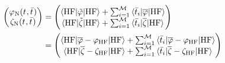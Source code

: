 \begin{equation}
  \begin{aligned}
  \begin{pmatrix}
    \varphi_{\mathrm{N}}(t_{}, \bar{t}_{}) \\
    \zeta_{\mathrm{N}}(t_{}, \bar{t}_{})
  \end{pmatrix}
  &=
  \begin{pmatrix}
   \braket{\mathrm{HF} | \tilde{\varphi} | \mathrm{HF}}
  + \sum_{i=1}^{\mathcal{M}}\braket{\bar{t}_{i} | \overline{\varphi} | \mathrm{HF}} \\
   \braket{\mathrm{HF} | \tilde{\zeta} | \mathrm{HF}}
  + \sum_{i=1}^{\mathcal{M}}\braket{\bar{t}_{i} | \overline{\zeta} | \mathrm{HF}}
  \end{pmatrix}
  \\
  &=
  \begin{pmatrix}
    \braket{\mathrm{HF} | \overline{\varphi} - \varphi_\mathrm{HF} | \mathrm{HF}}
  + \sum_{i=1}^{\mathcal{M}}\braket{\bar{t}_{i} | \overline{\varphi} - \varphi_\mathrm{HF} | \mathrm{HF}} \\
  \braket{\mathrm{HF} | \overline{\zeta} - \zeta_\mathrm{HF} | \mathrm{HF}}
  + \sum_{i=1}^{\mathcal{M}}\braket{\bar{t}_{i} | \overline{\zeta} -
  \zeta_\mathrm{HF}| \mathrm{HF}}
  \end{pmatrix}
\end{aligned}
\end{equation}


